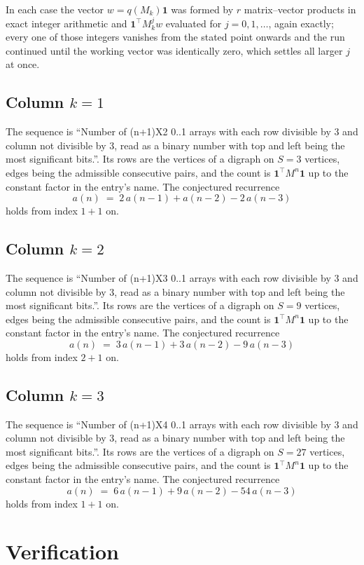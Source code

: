 \documentclass[11pt,a4paper]{article}
\theoremstyle{plain}
\theoremstyle{definition}
\begin{document}
In each case the vector $w=q(M_k)\mathbf{1}$ was formed by $r$ matrix--vector products in
exact integer arithmetic and $\mathbf{1}^{\!\top}M_k^{j}w$ evaluated for $j=0,1,\dots$,
again exactly; every one of those integers vanishes from the stated point onwards and the run
continued until the working vector was identically zero, which settles all larger $j$ at once.

\subsection*{Column $k$$=1$}
The sequence is ``Number of (n+1)X2 0..1 arrays with each row divisible by 3 and column not divisible by 3, read as a binary number with top and left being the most significant bits.''. Its rows are the vertices of a digraph on
$S=3$ vertices, edges being the admissible consecutive pairs, and the count is
$\mathbf{1}^{\!\top}M^{n}\mathbf{1}$ up to the constant factor in the entry's name.
The conjectured recurrence
\[
a(n)\;=\;2\,a(n-1) + a(n-2) - 2\,a(n-3)
\]
holds from index $1+1$ on.

\subsection*{Column $k$$=2$}
The sequence is ``Number of (n+1)X3 0..1 arrays with each row divisible by 3 and column not divisible by 3, read as a binary number with top and left being the most significant bits.''. Its rows are the vertices of a digraph on
$S=9$ vertices, edges being the admissible consecutive pairs, and the count is
$\mathbf{1}^{\!\top}M^{n}\mathbf{1}$ up to the constant factor in the entry's name.
The conjectured recurrence
\[
a(n)\;=\;3\,a(n-1) + 3\,a(n-2) - 9\,a(n-3)
\]
holds from index $2+1$ on.

\subsection*{Column $k$$=3$}
The sequence is ``Number of (n+1)X4 0..1 arrays with each row divisible by 3 and column not divisible by 3, read as a binary number with top and left being the most significant bits.''. Its rows are the vertices of a digraph on
$S=27$ vertices, edges being the admissible consecutive pairs, and the count is
$\mathbf{1}^{\!\top}M^{n}\mathbf{1}$ up to the constant factor in the entry's name.
The conjectured recurrence
\[
a(n)\;=\;6\,a(n-1) + 9\,a(n-2) - 54\,a(n-3)
\]
holds from index $1+1$ on.

\section{Verification}
\end{document}
